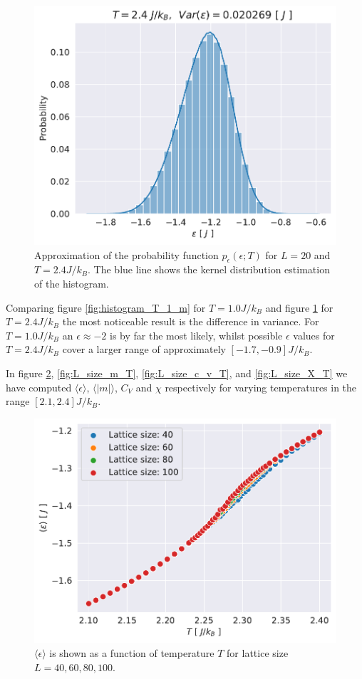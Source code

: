 \documentclass[english,notitlepage,reprint,nofootinbib]{revtex4-1}  %
\begin{document}
\begin{figure}[H]
    \centering
    \includegraphics[width=.5\textwidth]{../figures/histogram_T_2_4_m.pdf}
    \caption{Approximation of the probability function $p_{\epsilon}(\epsilon ; T)$ for $L=20$ and $T=2.4 J/k_B$. The blue line shows the kernel distribution estimation of the histogram.}
    \label{fig:histogram_T_2_4_m}
\end{figure}
Comparing figure \ref{fig:histogram_T_1_m} for $T=1.0 J/k_B$ and figure \ref{fig:histogram_T_2_4_m} for $T=2.4 J/k_B$ the most noticeable result is the difference in variance. For $T=1.0 J/k_B$ an $\epsilon \approx -2$ is by far the most likely, whilst possible $\epsilon$ values for $T=2.4 J/k_B$ cover a larger range of approximately $[-1.7,-0.9]J/k_B$.

\onecolumngrid
\newpage
\twocolumngrid

In figure \ref{fig:L_size_e_T}, \ref{fig:L_size_m_T}, \ref{fig:L_size_c_v_T},  and \ref{fig:L_size_X_T} we have computed $\langle \epsilon \rangle$, $\langle |m|\rangle$, $C_V$ and $\chi$ respectively for varying temperatures in the range $[2.1,2.4]J/k_B$.
\begin{figure}[H]
    \centering
    \includegraphics[width=.5\textwidth]{../figures/L_size_e_T.pdf}
    \caption{$\langle \epsilon \rangle$ is shown as a function of temperature $T$ for lattice size $L= 40, 60,80,100$.}
    \label{fig:L_size_e_T}
\end{figure}
\end{document}
